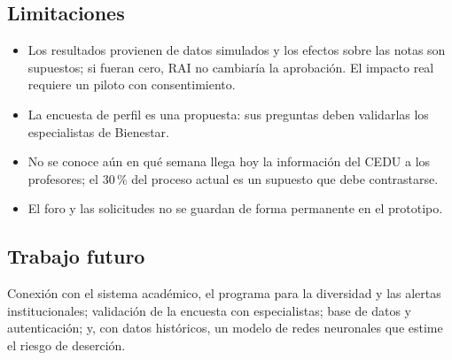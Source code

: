 \documentclass[12pt,letterpaper]{article}
\begin{document}
\subsection{Limitaciones}
\begin{itemize}
  \item Los resultados provienen de datos simulados y los efectos sobre las notas son supuestos; si fueran cero, RAI no cambiaría la aprobación. El impacto real requiere un piloto con consentimiento.
  \item La encuesta de perfil es una propuesta: sus preguntas deben validarlas los especialistas de Bienestar.
  \item No se conoce aún en qué semana llega hoy la información del CEDU a los profesores; el 30\,\% del proceso actual es un supuesto que debe contrastarse.
  \item El foro y las solicitudes no se guardan de forma permanente en el prototipo.
\end{itemize}

\subsection{Trabajo futuro}
Conexión con el sistema académico, el programa para la diversidad y las alertas institucionales; validación de la encuesta con especialistas; base de datos y autenticación; y, con datos históricos, un modelo de redes neuronales que estime el riesgo de deserción.

\end{document}
